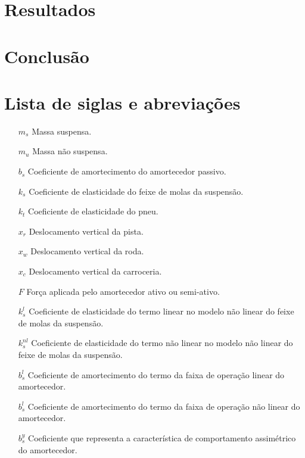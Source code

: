 \documentclass[a4paper]{ifacconf}
\begin{document}
    \section{Resultados}
    \section{Conclusão}
    
    
    
    \appendix
    \section{Lista de siglas e abreviações}
    \begin{itemize} 
        \item [$m_s$] Massa suspensa.
        \item [$m_u$] Massa não suspensa.
        \item [$b_s$] Coeficiente de amortecimento do amortecedor passivo. 
        \item [$k_s$] Coeficiente de elasticidade do feixe de molas da suspensão.
        \item [$k_t$] Coeficiente de elasticidade do pneu.
        \item [$x_r$] Deslocamento vertical da pista.
        \item [$x_w$] Deslocamento vertical da roda.
        \item [$x_c$] Deslocamento vertical da carroceria.
        \item [$F$] Força aplicada pelo amortecedor ativo ou semi-ativo.
        \item [$k^{l}_{s}$] Coeficiente de elasticidade do termo linear no modelo não linear do feixe de molas da suspensão.
        \item [$k^{nl}_{s}$] Coeficiente de elasticidade do termo não linear no modelo não linear do feixe de molas da suspensão.
        \item [$b^{l}_{s}$] Coeficiente de amortecimento do termo da faixa de operação linear do amortecedor.
        \item [$b^{l}_{s}$] Coeficiente de amortecimento do termo da faixa de operação não linear do amortecedor.
        \item [$b^{y}_{s}$] Coeficiente que representa a característica  de comportamento assimétrico do amortecedor.
    \end{itemize}
    
\end{document}

